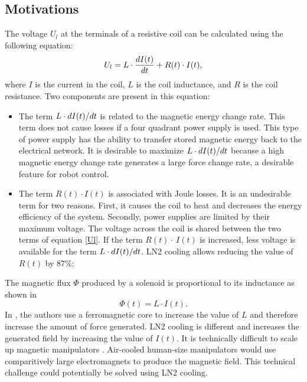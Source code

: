 \subsection{Motivations}
The voltage $U_l$ at the terminals of a resistive coil can be calculated using the following equation:
\begin{equation}
U_l=L\cdot\frac{d{I}(t)}{d{t}}+R(t)\cdot I(t),
\label{Ul}
\end{equation}
where $I$ is the current in the coil, $L$ is the coil inductance, and $R$ is the coil resistance.
Two components are present in this equation:
\begin{itemize}
\item The term $L\cdot d{I}(t)/ d{t}$ is related to the magnetic energy change rate. This term does not cause losses if a four quadrant power supply is used. This type of power supply has the ability to transfer stored magnetic energy back to the electrical network. It is desirable to maximize $L\cdot d{I}(t)/ d{t}$ because a high magnetic energy change rate generates a large force change rate, a desirable feature for robot control. 
\item The term $R(t)\cdot I(t)$ is associated with Joule losses. It is an undesirable term for two reasons. First, it causes the coil to heat and decreases the energy efficiency of the system. Secondly, power supplies are limited by their maximum voltage. The voltage across the coil is shared between the two terms of equation \ref{Ul}. If the term $R(t)\cdot~I(t)$ is increased, less voltage is available for the term $L\cdot d{I}(t)/ d{t}$. LN2 cooling allows reducing the value of $R(t)$ by 87\%;
\end{itemize}
The magnetic flux $\Phi$ produced by a solenoid is proportional to its inductance as shown in 
\begin{equation}
\Phi (t)=L\cdot I(t).
\label{flux}
\end{equation}
 In \cite{kummer2010octomag}, the authors use a ferromagnetic core to increase the value of $L$ and therefore increase the amount of force generated. LN2 cooling is different and increases the generated field by increasing the value of $I(t)$.
  It is technically difficult to scale up magnetic manipulators \cite{kummer2010octomag}. 
  Air-cooled human-size manipulators would use comparitively large electromagnets to produce the magnetic field.
  This technical challenge could potentially be solved using LN2 cooling.  
